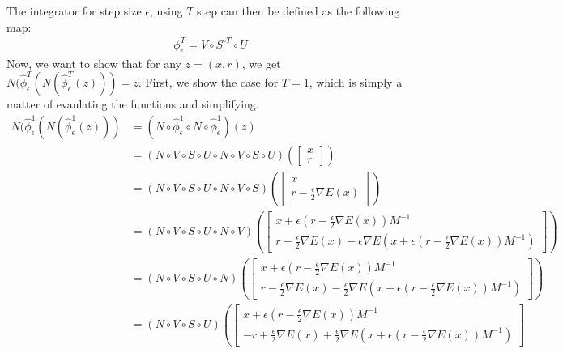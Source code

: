 The integrator for step size $\epsilon$, using $T$ step can then be defined as the following map:
\begin{align*}
    \phi^T_\epsilon = V\circ S^{\circ T} \circ U
\end{align*}
Now, we want to show that for any $z=(x, r)$, we get $N(\hat{\phi}^T_\epsilon(N(\hat{\phi}^T_\epsilon(z))) = z$. First, we show the case for $T=1$, which is simply a matter of evaulating the functions and simplifying.
\begin{align*}
    N (\hat{\phi}^1_\epsilon(N(\hat{\phi}^1_\epsilon(z))) 
    &=
    (N \circ \hat{\phi}^1_\epsilon \circ N \circ \hat{\phi}^1_\epsilon)(z) \\
    &= (N \circ V \circ S \circ U \circ N \circ V \circ S \circ U )\left( 
    \begin{bmatrix}
        x \\ r
    \end{bmatrix}
    \right) \\
    &= (N\circ V \circ S \circ U \circ N \circ V\circ S) \left(
    \begin{bmatrix}
        x \\ r - \frac{\epsilon}{2} \nabla E(x)
    \end{bmatrix}
    \right) \\
    &= (N\circ V \circ S \circ U \circ N \circ V )\left(
    \begin{bmatrix}
        x + \epsilon (r - \frac{\epsilon}{2} \nabla E(x)) M^{-1} \\ 
        r - \frac{\epsilon}{2} \nabla E(x) - \epsilon \nabla E(x + \epsilon (r - \frac{\epsilon}{2} \nabla E(x)) M^{-1})
    \end{bmatrix}
    \right) \\
    &= (N\circ V \circ S \circ U \circ N )\left(
    \begin{bmatrix}
        x + \epsilon (r - \frac{\epsilon}{2} \nabla E(x)) M^{-1} \\ 
        r - \frac{\epsilon}{2} \nabla E(x) - \frac{\epsilon}{2} \nabla E(x + \epsilon (r - \frac{\epsilon}{2} \nabla E(x)) M^{-1})
    \end{bmatrix}
    \right) \\
    &= (N\circ V \circ S \circ U )\left(
    \begin{bmatrix}
        x + \epsilon (r - \frac{\epsilon}{2} \nabla E(x)) M^{-1} \\ 
        -r + \frac{\epsilon}{2} \nabla E(x) + \frac{\epsilon}{2} \nabla E(x + \epsilon (r - \frac{\epsilon}{2} \nabla E(x)) M^{-1})

\end{bmatrix}
\end{align*}
